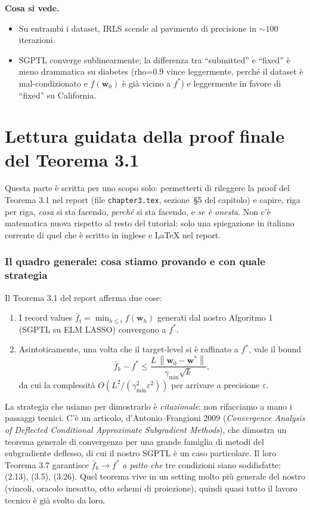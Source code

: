 \documentclass[11pt,a4paper]{article}
\newcommand{\norm}[1]{\left\|#1\right\|}
\newcommand{\bw}{\mathbf{w}}
\theoremstyle{definition}
\begin{document}
\textbf{Cosa si vede.}
\begin{itemize}[leftmargin=*]
\item Su entrambi i dataset, IRLS scende al pavimento di precisione in $\sim 100$ iterazioni.
\item SGPTL converge sublinearmente; la differenza tra ``submitted'' e ``fixed'' è meno drammatica su diabetes (rho=0.9 vince leggermente, perché il dataset è mal-condizionato e $f(\bw_0)$ è già vicino a $f^*$) e leggermente in favore di ``fixed'' su California.
\end{itemize}

\part{Lettura guidata della proof finale del Teorema 3.1}
\label{part:guided_proof}

Questa parte è scritta per uno scopo solo: permetterti di rileggere la proof del Teorema 3.1 nel report (file \texttt{chapter3.tex}, sezione~\S5 del capitolo) e capire, riga per riga, \emph{cosa} si sta facendo, \emph{perché} si sta facendo, e \emph{se è onesta}. Non c'è matematica nuova rispetto al resto del tutorial: solo una spiegazione in italiano corrente di quel che è scritto in inglese e LaTeX nel report.

\section{Il quadro generale: cosa stiamo provando e con quale strategia}

Il Teorema 3.1 del report afferma due cose:

\begin{enumerate}[leftmargin=*]
\item I record values $\bar f_i = \min_{h\le i} f(\bw_h)$ generati dal nostro Algoritmo 1 (SGPTL su ELM LASSO) convergono a $f^*$.
\item Asintoticamente, una volta che il target-level si è raffinato a $f^*$, vale il bound
\[
\bar f_k - f^* \le \frac{L\,\norm{\bw_0-\bw^*}}{\gamma_{\min}\sqrt k},
\]
da cui la complessità $O(L^2/(\gamma_{\min}^2\varepsilon^2))$ per arrivare a precisione $\varepsilon$.
\end{enumerate}

La strategia che usiamo per dimostrarlo è \emph{citazionale}: non rifacciamo a mano i passaggi tecnici. C'è un articolo, d'Antonio--Frangioni 2009 (\emph{Convergence Analysis of Deflected Conditional Approximate Subgradient Methods}), che dimostra un teorema generale di convergenza per una grande famiglia di metodi del subgradiente deflesso, di cui il nostro SGPTL è un caso particolare. Il loro Teorema 3.7 garantisce $\bar f_k \to f^*$ \emph{a patto che} tre condizioni siano soddisfatte: (2.13), (3.5), (3.26). Quel teorema vive in un setting molto più generale del nostro (vincoli, oracolo inesatto, otto schemi di proiezione), quindi quasi tutto il lavoro tecnico è già svolto da loro.
\end{document}
